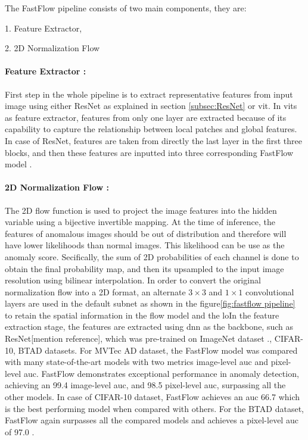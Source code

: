 The FastFlow pipeline consists of two main components, they are:

1. Feature Extractor,

2. 2D Normalization Flow

\paragraph*{Feature Extractor :}

First step in the whole pipeline is to extract representative features from input image using either ResNet as explained in section \ref{subsec:ResNet} or \gls{vit}. In \glspl{vit} as feature extractor, features from only one layer are extracted because of its capability to capture the relationship between local patches and global features. In case of ResNet, features are taken from directly the last layer in the first three blocks, and then these features are inputted into three corresponding FastFlow model \cite{yu2021fastflowunsupervisedanomalydetection}. 

\paragraph*{2D Normalization Flow :}

The 2D flow function is used to project the image features into the hidden variable using a bijective invertible mapping. At the time of inference, the features of anomalous images should be out of distribution and therefore will have lower likelihoods than normal images. This likelihood can be use as the anomaly score. Secifically, the sum of 2D probabilities of each channel is done to obtain the final probability map, and then its upsampled to the input image resolution using bilinear interpolation. In order to convert the original normalization flow into a 2D format, an alternate $3\times3$ and $1\times1$ convolutional layers are used in the default subnet as shown in the figure\ref{fig:fastflow pipeline} to retain the spatial information in the flow model and the loIn the feature extraction stage, the features are extracted using \gls{dnn} as the backbone, such as ResNet[mention reference], which was pre-trained on ImageNet\cite{5206848} dataset \cite{10208786}., CIFAR-10\cite{krizhevsky2009learning}, BTAD\cite{Mishra_2021} datasets. For MVTec AD dataset, the FastFlow model was compared with many state-of-the-art models with two metrics image-level \gls{auc} and pixel-level \gls{auc}. FastFlow demonstrates exceptional performance in anomaly detection, achieving an 99.4 image-level \gls{auc}, and 98.5 pixel-level \gls{auc}, surpassing all the other models. In case of CIFAR-10 dataset, FastFlow achieves an \gls{auc} 66.7 which is the best performing model when compared with others. For the BTAD dataset, FastFlow again surpasses all the compared models and achieves a pixel-level \gls{auc} of 97.0 \cite{yu2021fastflowunsupervisedanomalydetection}.


